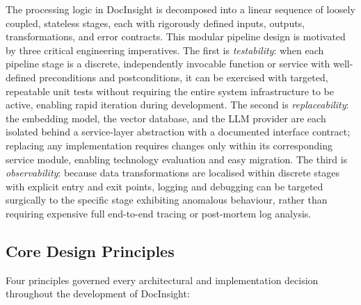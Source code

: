 The processing logic in DocInsight is decomposed into a linear sequence of loosely coupled, stateless stages, each with rigorously defined inputs, outputs, transformations, and error contracts. This modular pipeline design is motivated by three critical engineering imperatives. The first is \textit{testability}: when each pipeline stage is a discrete, independently invocable function or service with well-defined preconditions and postconditions, it can be exercised with targeted, repeatable unit tests without requiring the entire system infrastructure to be active, enabling rapid iteration during development. The second is \textit{replaceability}: the embedding model, the vector database, and the LLM provider are each isolated behind a service-layer abstraction with a documented interface contract; replacing any implementation requires changes only within its corresponding service module, enabling technology evaluation and easy migration. The third is \textit{observability}: because data transformations are localised within discrete stages with explicit entry and exit points, logging and debugging can be targeted surgically to the specific stage exhibiting anomalous behaviour, rather than requiring expensive full end-to-end tracing or post-mortem log analysis.

\subsection{Core Design Principles}

Four principles governed every architectural and implementation decision throughout the development of DocInsight:

